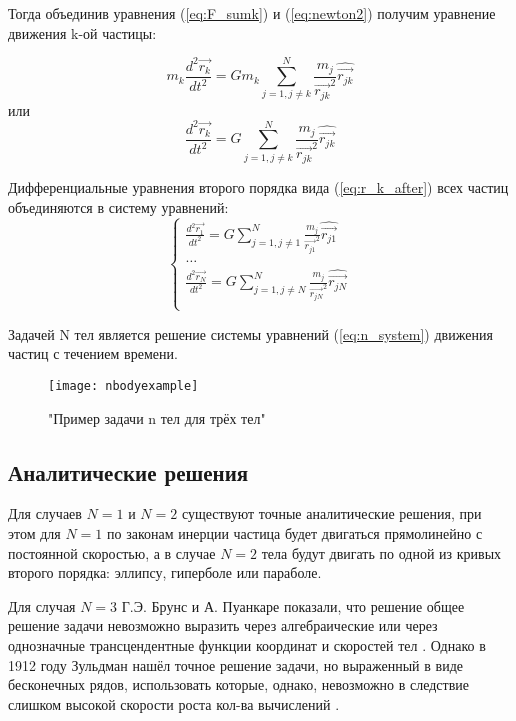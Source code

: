 Тогда объединив уравнения (\ref{eq:F_sumk}) и (\ref{eq:newton2}) получим уравнение движения k-ой частицы:
 
 \begin{equation}
 	\label{eq:r_k_before}
 	m_k\frac{d^2\vec{r_k}}{dt^2} = Gm_k\sum_{j=1, j \neq k}^{N}{\frac{m_j}{\vec{r_{jk}}^2}\hat{\vec{r_{jk}}}}
 \end{equation}
 или
 \begin{equation}
 	\label{eq:r_k_after}
 	\frac{d^2\vec{r_k}}{dt^2} = G\sum_{j=1, j \neq k}^{N}{\frac{m_j}{\vec{r_{jk}}^2}\hat{\vec{r_{jk}}}}
 \end{equation}
 
 Дифференциальные уравнения второго порядка вида (\ref{eq:r_k_after}) всех частиц объединяются в систему уравнений:
  \begin{equation}
 	\label{eq:n_system}
 	\begin{cases}
 		\frac{d^2\vec{r_1}}{dt^2} = G\sum_{j=1, j \neq 1}^{N}{\frac{m_j}{\vec{r_{j1}}^2}\hat{\vec{r_{j1}}}} \\
 		\dots \\
 		\frac{d^2\vec{r_N}}{dt^2} = G\sum_{j=1, j \neq N}^{N}{\frac{m_j}{\vec{r_{jN}}^2}\hat{\vec{r_{jN}}}} \\
 	\end{cases}
 \end{equation}

Задачей N тел является решение системы уравнений (\ref{eq:n_system}) движения частиц с течением времени.

\begin{figure}[h]
	\centering
	\texttt{[image: nbodyexample]}
	\caption{"Пример задачи n тел для трёх тел"}
	\label{fig:nbodyexample}
\end{figure}
\subsection{Аналитические решения}
Для случаев $N = 1$ и $N = 2$ существуют точные аналитические решения, при этом для $N = 1$ по законам инерции частица будет двигаться прямолинейно с постоянной скоростью, а в случае $N = 2$ тела будут двигать по одной из кривых второго порядка: эллипсу, гиперболе или параболе.

Для случая $N = 3$ Г.Э. Брунс и А. Пуанкаре показали, что решение общее решение задачи невозможно выразить через алгебраические или через однозначные трансцендентные функции координат и скоростей тел \cite{markeev}. Однако в 1912 году Зульдман нашёл точное решение задачи, но выраженный в виде бесконечных рядов, использовать которые, однако, невозможно в следствие слишком высокой скорости роста кол-ва вычислений \cite{markeev}.


